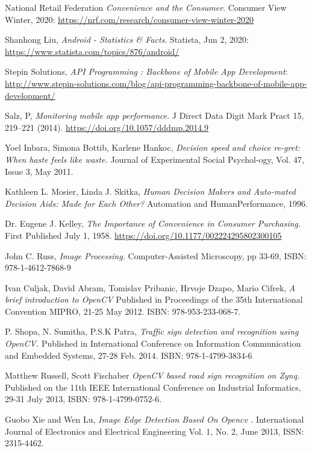 \documentclass[12pt,a4paper,twoside]{report}
\begin{document}
\begin{thebibliography}{9}

National Retail Federation
\textit{Convenience and the Consumer}. 
Consumer View Winter, 2020:
\url{https://nrf.com/research/consumer-view-winter-2020}

 Shanhong Liu,
 \textit{Android - Statistics & Facts}. 
Statista, Jun 2, 2020:
\url{https://www.statista.com/topics/876/android/}

Stepin Solutions,
 \textit{API Programming : Backbone of Mobile App Development}: 
\url{http://www.stepin-solutions.com/blog/api-programming-backbone-of-mobile-app-development/}

Salz, P,
 \textit{Monitoring mobile app performance}.
 J Direct Data Digit Mark Pract 15, 219–221 (2014).
\url{https://doi.org/10.1057/dddmp.2014.9}

Yoel Inbara, Simona Bottib, Karlene Hankoc,
\textit{Decision speed and choice re-gret: When haste feels like waste.}
 Journal of Experimental Social Psychol-ogy, Vol. 47, Issue 3, May 2011.
 
Kathleen L. Mosier, Linda J. Skitka,
\textit{Human Decision Makers and Auto-mated Decision Aids: Made for Each Other?}
Automation and HumanPerformance, 1996.

Dr. Eugene J. Kelley,
\textit{The Importance of Convenience in Consumer Purchasing.}
First Published July 1, 1958.
\url{https://doi.org/10.1177/002224295802300105}

John C. Russ,
\textit{Image Processing.}
Computer-Assisted Microscopy, pp 33-69, ISBN: 978-1-4612-7868-9

Ivan Culjak, David Abram, Tomislav Pribanic, Hrvoje Dzapo, Mario Cifrek,
\textit{A brief introduction to OpenCV}
Published in Proceedings of the 35th International Convention MIPRO, 21-25 May 2012. ISBN: 978-953-233-068-7.

P. Shopa, N. Sumitha, P.S.K Patra,
\textit{Traffic sign detection and recognition using OpenCV.}
Published in International Conference on Information Communication and Embedded Systems, 27-28 Feb. 2014. ISBN: 978-1-4799-3834-6

Matthew Russell, Scott Fischaber
\textit{OpenCV based road sign recognition on Zynq.}
Published on the 11th IEEE International Conference on Industrial Informatics, 29-31 July 2013, ISBN:  978-1-4799-0752-6.

Guobo Xie and Wen Lu,
\textit{Image Edge Detection Based On Opencv .}
International Journal of Electronics and Electrical Engineering Vol. 1, No. 2, June 2013, ISSN: 2315-4462.


\end{thebibliography}
\end{document}
